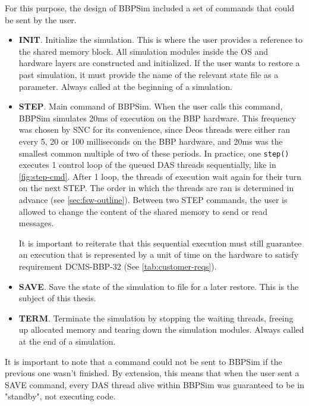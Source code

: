 {For this purpose, the design of BBPSim included a set of commands that could be sent by the user. 
\begin{itemize}
	\item \textbf{INIT}. Initialize the simulation. This is where the user provides a reference to the shared memory block. All simulation modules inside the OS and hardware layers are constructed and initialized. If the user wants to restore a past simulation, it must provide the name of the relevant state file as a parameter. Always called at the beginning of a simulation.
	\item \textbf{STEP}. Main command of BBPSim. When the user calls this command, BBPSim simulates 20ms of execution on the BBP hardware. This frequency was chosen by \gls{SNC} for its convenience, since Deos threads were either ran every 5, 20 or 100 milliseconds on the BBP hardware, and 20ms was the smallest common multiple of two of these periods.  In practice, one \texttt{step()} executes 1 control loop of the queued DAS threads sequentially, like in \autoref{fig:step-cmd}. After 1 loop, the threads of execution wait again for their turn on the next STEP. The order in which the threads are ran is determined in advance (see \autoref{sec:fsw-outline}). Between two STEP commands, the user is allowed to change the content of the shared memory to send or read messages. \par
	\begin{minipage}{\linewidth}
		\vspace{12pt}
		\centering
		
		\label{fig:step-cmd}
		\vspace{12pt}
	\end{minipage}
	It is important to reiterate that this sequential execution must still guarantee an execution that is represented by a unit of time on the hardware to satisfy requirement DCMS-BBP-32 (See \autoref{tab:customer-reqs}).
	\item \textbf{SAVE}. Save the state of the simulation to file for a later restore. This is the subject of this thesis. 
	\item \textbf{TERM}. Terminate the simulation by stopping the waiting threads, freeing up allocated memory and tearing down the simulation modules. Always called at the end of a simulation.
\end{itemize}
It is important to note that a command could not be sent to BBPSim if the previous one wasn't finished. By extension, this means that when the user sent a SAVE command, every DAS thread alive within BBPSim was guaranteed to be in "standby", not executing code. 

}

